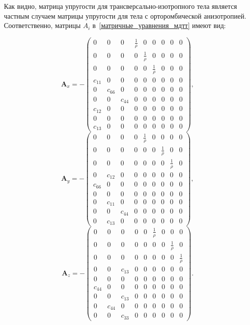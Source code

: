\documentclass[thesis.tex]{subfiles}
\begin{document}
Как видно, матрица упругости для трансверсально-изотропного тела является частным случаем матрицы упругости для тела с
орторомбической анизотропией. Соответственно, матрицы $A_i$ в~\eqref{матричные_уравнения_мдтт} имеют вид:
\begin{small}
\[
    \mathbf{A}_x = -\begin{pmatrix}
    0 & 0 & 0 & \frac 1 \rho & 0 & 0 & 0 & 0 & 0 \\
    0 & 0 & 0 & 0 & \frac 1 \rho & 0 & 0 & 0 & 0 \\
    0 & 0 & 0 & 0 & 0 & \frac 1 \rho & 0 & 0 & 0 \\
    c_{11} & 0 & 0 & 0 & 0 & 0 & 0 & 0 & 0 \\
    0 & c_{66} & 0 & 0 & 0 & 0 & 0 & 0 & 0 \\
    0 & 0 & c_{44} & 0 & 0 & 0 & 0 & 0 & 0 \\
    c_{12} & 0 & 0 & 0 & 0 & 0 & 0 & 0 & 0 \\
    0 & 0 & 0 & 0 & 0 & 0 & 0 & 0 & 0 \\
    c_{13} & 0 & 0 & 0 & 0 & 0 & 0 & 0 & 0
    \end{pmatrix},
\]
\[
    \mathbf{A}_y = -\begin{pmatrix}
    0 & 0 & 0 & 0 & \frac 1 \rho & 0 & 0 & 0 & 0 \\
    0 & 0 & 0 & 0 & 0 & 0 & \frac 1 \rho & 0 & 0 \\
    0 & 0 & 0 & 0 & 0 & 0 & 0 & \frac 1 \rho & 0 \\
    0 & c_{12} & 0 & 0 & 0 & 0 & 0 & 0 & 0 \\
    c_{66} & 0 & 0 & 0 & 0 & 0 & 0 & 0 & 0 \\
    0 & 0 & 0 & 0 & 0 & 0 & 0 & 0 & 0 \\
    0 & c_{11} & 0 & 0 & 0 & 0 & 0 & 0 & 0 \\
    0 & 0 & c_{44} & 0 & 0 & 0 & 0 & 0 & 0 \\
    0 & c_{13} & 0 & 0 & 0 & 0 & 0 & 0 & 0
    \end{pmatrix},
\]
\[
    \mathbf{A}_z = -\begin{pmatrix}
    0 & 0 & 0 & 0 & 0 & \frac 1 \rho & 0 & 0 & 0 \\
    0 & 0 & 0 & 0 & 0 & 0 & 0 & \frac 1 \rho & 0 \\
    0 & 0 & 0 & 0 & 0 & 0 & 0 & 0 & \frac 1 \rho \\
    0 & 0 & c_{13} & 0 & 0 & 0 & 0 & 0 & 0 \\
    0 & 0 & 0 & 0 & 0 & 0 & 0 & 0 & 0 \\
    c_{44} & 0 & 0 & 0 & 0 & 0 & 0 & 0 & 0 \\
    0 & 0 & c_{13} & 0 & 0 & 0 & 0 & 0 & 0 \\
    0 & c_{44} & 0 & 0 & 0 & 0 & 0 & 0 & 0 \\
    0 & 0 & c_{33} & 0 & 0 & 0 & 0 & 0 & 0
    \end{pmatrix}.
\]
\end{small}
\end{document}
